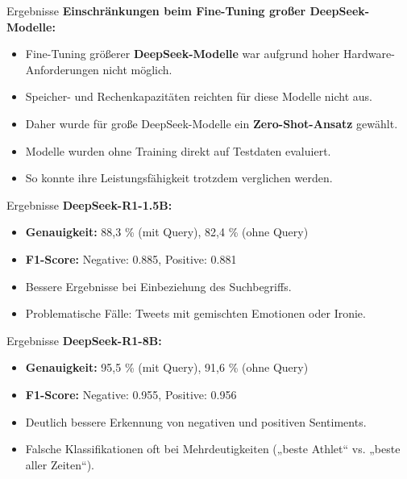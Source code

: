 \documentclass[aspectratio=169]{beamer} %
\begin{document}
\begin{frame}{Ergebnisse}
  \Large
  \textbf{Einschränkungen beim Fine-Tuning großer DeepSeek-Modelle:}

  \vspace{0.5cm}

  \begin{itemize}
      \item Fine-Tuning größerer \textbf{DeepSeek-Modelle} war aufgrund hoher Hardware-Anforderungen nicht möglich.
      \item Speicher- und Rechenkapazitäten reichten für diese Modelle nicht aus.
      \item Daher wurde für große DeepSeek-Modelle ein \textbf{Zero-Shot-Ansatz} gewählt.
      \item Modelle wurden ohne Training direkt auf Testdaten evaluiert.
      \item So konnte ihre Leistungsfähigkeit trotzdem verglichen werden.
  \end{itemize}

\end{frame}

\begin{frame}{Ergebnisse}
  \Large
  \textbf{DeepSeek-R1-1.5B:}

  \vspace{0.5cm}
  \begin{itemize}
      \item \textbf{Genauigkeit:} 88,3 \% (mit Query), 82,4 \% (ohne Query)
      \item \textbf{F1-Score:} Negative: 0.885, Positive: 0.881
      \item Bessere Ergebnisse bei Einbeziehung des Suchbegriffs.
      \item Problematische Fälle: Tweets mit gemischten Emotionen oder Ironie.
  \end{itemize}
\end{frame}

\begin{frame}{Ergebnisse}
  \Large
  \textbf{DeepSeek-R1-8B:}

  \vspace{0.5cm}
  \begin{itemize}
      \item \textbf{Genauigkeit:} 95,5 \% (mit Query), 91,6 \% (ohne Query)
      \item \textbf{F1-Score:} Negative: 0.955, Positive: 0.956
      \item Deutlich bessere Erkennung von negativen und positiven Sentiments.
      \item Falsche Klassifikationen oft bei Mehrdeutigkeiten („beste Athlet“ vs. „beste aller Zeiten“).
  \end{itemize}
\end{frame}
\end{document}
